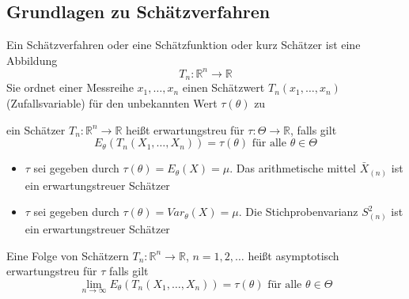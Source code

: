 \documentclass[
	ngerman,
	accentcolor=9c,%
	type=intern,
	marginpar=false
	]{tudapub}
\begin{document}
        \subsection{Grundlagen zu Schätzverfahren}
            \setcounter{satz}{1}
            \begin{definition}
                Ein Schätzverfahren oder eine Schätzfunktion oder kurz Schätzer ist eine Abbildung
                \begin{equation*}
                    T_n:\mathbb{R}^n \rightarrow \mathbb{R}
                \end{equation*}
                Sie ordnet einer Messreihe $x_1,\dots,x_n$ einen Schätzwert $T_n(x_1,\dots,x_n)$ (Zufallsvariable) für den unbekannten Wert $\tau(\theta)$ zu
            \end{definition}
            \begin{definition}
                ein Schätzer $T_n:\mathbb{R}^n \rightarrow \mathbb{R}$ heißt erwartungstreu für $\tau:\Theta \rightarrow \mathbb{R}$, falls gilt
                \begin{equation*}
                    E_\theta(T_n(X_1,\dots,X_n)) = \tau(\theta)\text{ für alle }\theta \in \Theta
                \end{equation*}
            \end{definition}
            \begin{definition}
                \begin{itemize}
                    \item $\tau$ sei gegeben durch $\tau(\theta) = E_\theta(X) = \mu$. Das arithmetische mittel $\bar{X}_{(n)}$ ist ein erwartungstreuer Schätzer
                    \item $\tau$ sei gegeben durch $\tau(\theta) = Var_\theta(X) = \mu$. Die Stichprobenvarianz $S^2_{(n)}$ ist ein erwartungstreuer Schätzer
                \end{itemize}
            \end{definition}
            \begin{definition}
                Eine Folge von Schätzern $T_n:\mathbb{R}^n \rightarrow \mathbb{R}$, $n = 1,2,\dots$ heißt asymptotisch erwartungstreu für $\tau$ falls gilt
                \begin{equation*}
                    \lim_{n\rightarrow \infty}  E_\theta(T_n(X_1,\dots,X_n)) = \tau(\theta) \text{ für alle } \theta \in \Theta
                \end{equation*}
            \end{definition}
\end{document}
